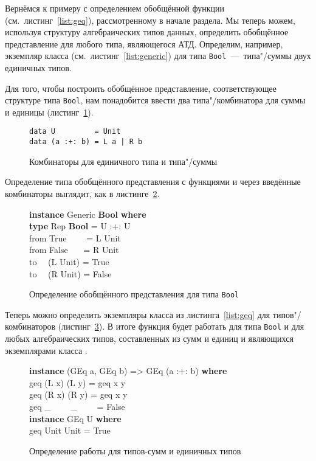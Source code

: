 Вернёмся к примеру с определением обобщённой функции 
(см.~листинг~\ref{list:geq}), рассмотренному в начале раздела. Мы
теперь можем, используя структуру алгебраических типов данных,
определить обобщённое представление для любого типа, являющегося
АТД. Определим, например, экземпляр класса 
(см.~листинг~\ref{list:generic}) для типа
\lstinline{Bool}~---~типа"/суммы двух единичных типов.

Для того, чтобы построить обобщённое представление,
соответствующее структуре типа \lstinline{Bool}, нам понадобится
ввести два типа"/комбинатора для суммы и единицы
(листинг~\ref{list:sum-unit}).
\begin{figure}[h]
\begin{framed}
\vspace{-0.25cm}
\begin{lstlisting}
data U         = Unit
data (a :+: b) = L a | R b
\end{lstlisting}
\vspace{-0.25cm}
\end{framed}
\caption{Комбинаторы для единичного типа и типа"/суммы}
\label{list:sum-unit}
\end{figure}

Определение типа обобщённого представления  с функциями  и  через введённые
комбинаторы выглядит, как в листинге~\ref{list:generic-bool}.
\begin{figure}[h]
\begin{framed}
\ttfamily\small
\textbf{instance} Generic \textbf{Bool} \textbf{where}\\
\ind\textbf{type} Rep \textbf{Bool} = U :+: U\\
\ind from True~~~~ = L Unit\\
\ind from False~~~ = R Unit\\
\ind to~~ (L Unit) = True\\
\ind to~~ (R Unit) = False
\end{framed}
\caption{Определение обобщённого представления для типа \lstinline{Bool}}
\label{list:generic-bool}
\end{figure}

Теперь можно определить экземпляры класса  из
листинга~\ref{list:geq} для типов"/комбинаторов
(листинг~\ref{list:geq-sum-unit}). В итоге функция  будет
работать для типа \lstinline{Bool} и для любых алгебраических типов,
составленных из сумм и единиц и являющихся экземплярами класса
.
\begin{figure}[h]
\begin{framed}
\ttfamily\small
\textbf{instance} (GEq a, GEq b) => GEq (a :+: b) \textbf{where}\\
\ind geq (L x) (L y) = geq x y\\
\ind geq (R x) (R y) = geq x y\\
\ind geq \_~~~~ \_~~~~ = False\\
\textbf{instance} GEq U \textbf{where}\\
\ind geq Unit Unit = True
\end{framed}
\caption{Определение работы  для типов-сумм и единичных типов}
\label{list:geq-sum-unit}
\end{figure}

